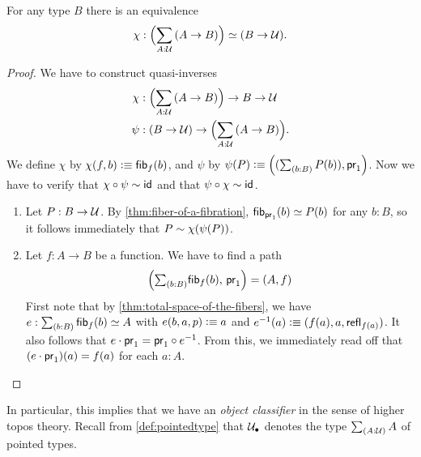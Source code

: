 \begin{thm}\label{thm:nobject-classifier-appetizer}
For any type $B$ there is an equivalence
\begin{equation*}
\chi:\Parens{\sm{A:\type} (A\to B)}\eqvsym (B\to\type).
\end{equation*}
\end{thm}
\begin{proof}
We have to construct quasi-inverses
\begin{align*}
\chi & : \Parens{\sm{A:\type} (A\to B)}\to B\to\type\\
\psi & : (B\to\type)\to\Parens{\sm{A:\type} (A\to B)}.
\end{align*}
We define $\chi$ by $\chi(f,b)\vcentcolon\equiv{\mathsf{fib}}_{f}(b)$, and $\psi$ by $\psi(P)\defeq\Pairr{(\sm{b:B} P(b)),\proj1}$.
Now we have to verify that $\chi\circ\psi\sim\mathsf{id}_{}{}$ and that $\psi\circ\chi \sim\mathsf{id}_{}{}$.
\begin{enumerate}
\item Let $P:B\to\mathcal{U}$.
  By \autoref{thm:fiber-of-a-fibration},
${\mathsf{fib}}_{\mathsf{pr}_{1}}(b)\simeq P(b)$ for any $b:B$, so it follows immediately
that $P\sim\chi(\psi(P))$.
\item Let $f:A\to B$ be a function. We have to find a path
\begin{equation*}
\Pairr{\tsm{b:B} \hfiber{f}b,\,\proj1}=\pairr{A,f}
\end{equation*}
First note that by \autoref{thm:total-space-of-the-fibers}, we have
$e:\sm{b:B} \hfiber{f}b\eqvsym A$ with $e(b,a,p)\vcentcolon\equiv a$ and $e^{-1}(a)
\vcentcolon\equiv(f(a),a,\mathsf{refl}_{f(a)})$. It also follows that
$e\cdot\mathsf{pr}_{1}=\mathsf{pr}_{1}\circ e^{-1}$. From this, we immediately read off
that $(e\cdot\mathsf{pr}_{1})(a)= f(a)$ for each $a:A$.\qedhere
\end{enumerate}
\end{proof}

\noindent
{}%
%
%
In particular, this implies that we have an \emph{object classifier} in the sense of higher topos theory.
Recall from \autoref{def:pointedtype} that $\mathcal{U}_\bullet$ denotes the type $\sm{A:\type} A$ of pointed types.


